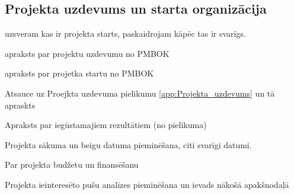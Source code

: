 \subsection{Projekta uzdevums un starta organizācija}
uzsveram kas ir projekta starts, paskaidrojam kāpēc tas ir svarīgs.
\par
apraksts par projektu uzdevumu no PMBOK
\par
apraksts par projetka startu no PMBOK
\par
Atsauce uz Proejkta uzdevuma pielikumu \ref{app:Projekta_uzdevums} un tā apraskts
\par
Apraksts par iegūstamajiem rezultātiem (no pielikuma)
\par
Projekta sākuma un beigu datuma pieminēšana, citi svarīgi datumi.
\par
Par projekta budžetu un finansēšanu
\par
Projekta ieinteresēto pušu analīzes pieminēšana un ievads nākošā apakšnodaļā